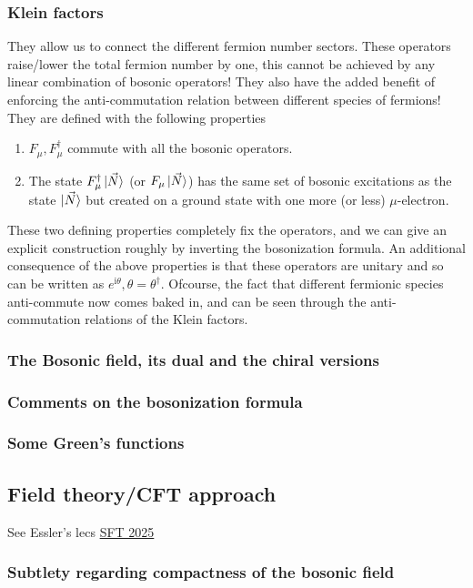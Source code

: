 \documentclass{article}
\renewcommand{\i}{\mathrm{i}}
\renewcommand{\i}{\mathrm{i}}
\begin{document}
\subsubsection{Klein factors}
They allow us to connect the different fermion number sectors. These operators raise/lower the total fermion number by one, this cannot be achieved by any linear combination of bosonic operators! They also have the added benefit of enforcing the anti-commutation relation between different species of fermions!
They are defined with the following properties
\begin{enumerate}
    \item $F_{\mu}, F^{\dagger} _{\mu}$ commute with all the bosonic operators.
    \item The state $F^{\dagger}_\mu \ket{\vec{N}}$ (or $F_\mu \ket{\vec{N}}$) has the same set of bosonic excitations as the state $\ket{\vec{N}}$ but created on a ground state with one more (or less) $\mu$-electron.
\end{enumerate}
These two defining properties completely fix the operators, and we can give an explicit construction roughly by inverting the bosonization formula. An additional consequence of the above properties is that these operators are unitary and so can be written as $e^{\i\theta}, \theta = \theta^{\dagger}$. Ofcourse, the fact that different fermionic species anti-commute now comes baked in, and can be seen through the anti-commutation relations of the Klein factors.
\subsubsection{The Bosonic field, its dual and the chiral versions}
\subsubsection{Comments on the bosonization formula}
\subsubsection{Some Green's functions}
\subsection{Field theory/CFT approach}
See Essler's lecs \href{https://www.youtube.com/watch?v=kJxjjw4IjcY&list=PL1CFLtxeIrQqJdlEyPVjCmrOYKrmTIzvo&index=5}{SFT 2025}
\subsubsection{Subtlety regarding compactness of the bosonic field}
\end{document}
